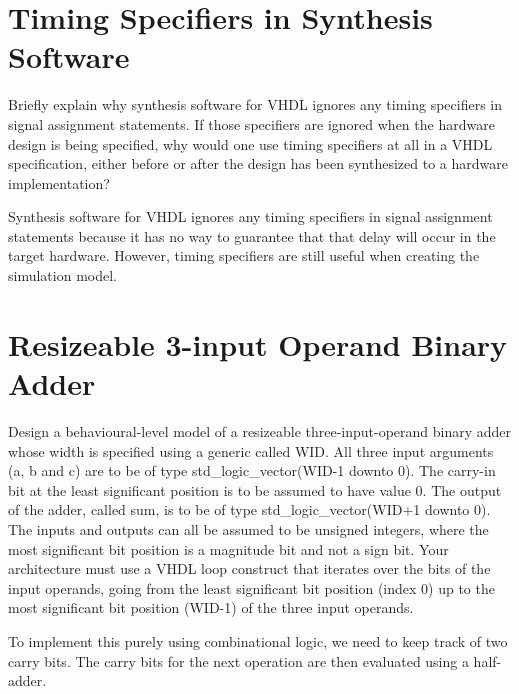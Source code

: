 \documentclass{article}
\begin{document}
\section{Timing Specifiers in Synthesis Software}

\begin{displayquote}
Briefly explain why synthesis software for VHDL ignores any timing specifiers in signal assignment statements. If those specifiers are ignored when the hardware design is being specified, why would one use timing specifiers at all in a VHDL specification, either before or after the design has been synthesized to a hardware implementation?
\end{displayquote}

Synthesis software for VHDL ignores any timing specifiers in signal assignment statements because it has no way to guarantee that that delay will occur in the target hardware. However, timing specifiers are still useful when creating the simulation model.

\section{Resizeable 3-input Operand Binary Adder}

\begin{displayquote}
Design a behavioural-level model of a resizeable three-input-operand binary adder whose width is specified using a generic called WID. All three input arguments (a, b and c) are to be of type std\_logic\_vector(WID-1 downto 0). The carry-in bit at the least significant position is to be assumed to have value 0. The output of the adder, called sum, is to be of type std\_logic\_vector(WID+1 downto 0). The inputs and outputs can all be assumed to be unsigned integers, where the most significant bit position is a magnitude bit and not a sign bit. Your architecture must use a VHDL loop construct that iterates over the bits of the input operands, going from the least significant bit position (index 0) up to the most significant bit position (WID-1) of the three input operands.
\end{displayquote}

To implement this purely using combinational logic, we need to keep track of two
carry bits.  
The carry bits for the next operation are then evaluated using a half-adder.
\end{document}
